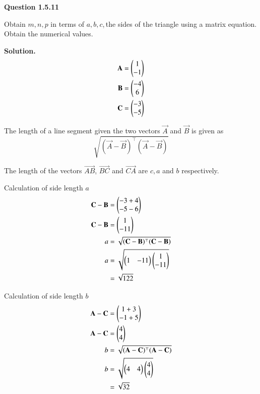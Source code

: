 \documentclass[journal,12pt,twocolumn]{IEEEtran}
\theoremstyle{remark}
\begin{document}



\maketitle
\textbf{Question 1.5.11}

\vspace{0.2cm}
Obtain $m,n,p$ in terms of $a,b,c$,\,the sides of the triangle using a matrix equation. Obtain the numerical values.

\vspace{0.3cm}
\textbf{Solution.}
\begin{align}
\mathbf{A} = \begin{pmatrix}1\\-1\end{pmatrix}\\
\mathbf{B} = \begin{pmatrix}-4\\6\end{pmatrix}\\
\mathbf{C} = \begin{pmatrix}-3\\-5\end{pmatrix}
\end{align}


\vspace{0.3cm}
The length of a line segment given the two vectors $\vec{A}$ and $\vec{B}$ is given as
$$\sqrt{(\vec{A}-\vec{B})^{\top}(\vec{A}-\vec{B})}$$

\vspace{0.3cm}
The length of the vectors $\vec{AB}$, $\vec{BC}$ and $\vec{CA}$ are $c,a$ and $b$ respectively.

\vspace{0.3cm}
Calculation of side length $a$
\begin{align}
\mathbf{C}-\mathbf{B} &= \begin{pmatrix}-3+4\\-5-6\end{pmatrix}\\
\mathbf{C}-\mathbf{B} &= \begin{pmatrix}1\\-11\end{pmatrix}\\
a &= \sqrt{(\mathbf{C}-\mathbf{B})^{\top}(\mathbf{C}-\mathbf{B})}\\
a &= \sqrt{\begin{pmatrix}1&-11\end{pmatrix}\begin{pmatrix}1\\-11\end{pmatrix}}\\
&= \sqrt{122}
\end{align}

\vspace{0.3cm}
Calculation of side length $b$
\begin{align}
\mathbf{A}-\mathbf{C} &= \begin{pmatrix}1+3\\-1+5\end{pmatrix}\\
\mathbf{A}-\mathbf{C} &= \begin{pmatrix}4\\4\end{pmatrix}\\
b &= \sqrt{(\mathbf{A}-\mathbf{C})^{\top}(\mathbf{A}-\mathbf{C})}\\
b &= \sqrt{\begin{pmatrix}4&4\end{pmatrix}\begin{pmatrix}4\\4\end{pmatrix}}\\
&= \sqrt{32}
\end{align}
\end{document}
